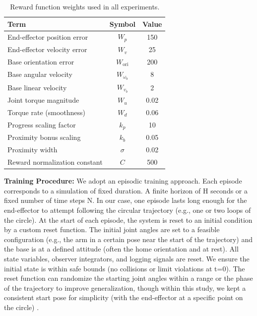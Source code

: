 \documentclass{ieeeaccess}
\begin{document}
\begin{table}[!b]
\centering
\caption{Reward function weights used in all experiments.}
\label{tab:reward_weights}
\begin{tabular}{lcc}
\toprule
\textbf{Term} & \textbf{Symbol} & \textbf{Value} \\
\midrule
End-effector position error      & $W_p$              & 150   \\
End-effector velocity error      & $W_v$              & 25    \\
Base orientation error           & $W_{\text{ori}}$   & 200   \\
Base angular velocity            & $W_{\omega_b}$     & 8     \\
Base linear velocity             & $W_{v_b}$          & 2     \\
Joint torque magnitude           & $W_u$              & 0.02  \\
Torque rate (smoothness)         & $W_d$              & 0.06  \\
Progress scaling factor          & $k_p$              & 10    \\
Proximity bonus scaling          & $k_b$              & 0.05  \\
Proximity width                  & $\sigma$           & 0.02  \\
Reward normalization constant    & $C$                & 500   \\
\bottomrule
\end{tabular}
\end{table}

\textbf{Training Procedure:} We adopt an episodic training approach. Each episode corresponds to a
simulation of fixed duration. A finite horizon of H seconds or a fixed number of time steps N. In our case,
one episode lasts long enough for the end-effector to attempt following the circular trajectory (e.g., one
or two loops of the circle). At the start of each episode, the system is reset to an initial condition by a
custom reset function. The initial joint angles are set to a feasible configuration (e.g., the arm in a
certain pose near the start of the trajectory) and the base is at a defined attitude (often the home
orientation and at rest). All state variables, observer
integrators, and logging signals are reset. We ensure the initial state is within safe bounds (no
collisions or limit violations at t=0). The reset function can randomize the starting joint angles within a
range or the phase of the trajectory to improve generalization, though within this study, we kept a
consistent start pose for simplicity (with the end-effector at a specific point on the circle) \cite{b7}.
 
\end{document}
